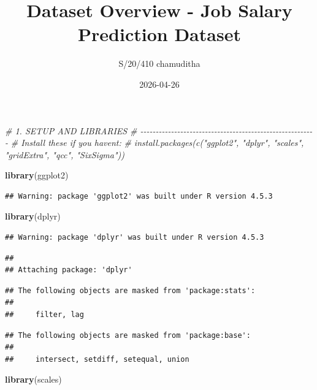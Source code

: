 \documentclass[
]{article}
\title{Dataset Overview - Job Salary Prediction Dataset}
\author{S/20/410 chamuditha}
\date{2026-04-26}
\newenvironment{Shaded}{\begin{snugshade}}{\end{snugshade}}
\newcommand{\CommentTok}[1]{\textcolor[rgb]{0.56,0.35,0.01}{\textit{#1}}}
\newcommand{\FunctionTok}[1]{\textcolor[rgb]{0.13,0.29,0.53}{\textbf{#1}}}
\newcommand{\NormalTok}[1]{#1}
\begin{document}
\maketitle

\begin{Shaded}
\begin{Highlighting}[]
\CommentTok{\# 1. SETUP AND LIBRARIES}
\CommentTok{\# {-}{-}{-}{-}{-}{-}{-}{-}{-}{-}{-}{-}{-}{-}{-}{-}{-}{-}{-}{-}{-}{-}{-}{-}{-}{-}{-}{-}{-}{-}{-}{-}{-}{-}{-}{-}{-}{-}{-}{-}{-}{-}{-}{-}{-}{-}{-}{-}{-}{-}{-}{-}{-}{-}{-}{-}{-}}
\CommentTok{\# Install these if you haven\textquotesingle{}t: }
\CommentTok{\# install.packages(c("ggplot2", "dplyr", "scales", "gridExtra", "qcc", "SixSigma"))}

\FunctionTok{library}\NormalTok{(ggplot2)}
\end{Highlighting}
\end{Shaded}

\begin{verbatim}
## Warning: package 'ggplot2' was built under R version 4.5.3
\end{verbatim}

\begin{Shaded}
\begin{Highlighting}[]
\FunctionTok{library}\NormalTok{(dplyr)}
\end{Highlighting}
\end{Shaded}

\begin{verbatim}
## Warning: package 'dplyr' was built under R version 4.5.3
\end{verbatim}

\begin{verbatim}
## 
## Attaching package: 'dplyr'
\end{verbatim}

\begin{verbatim}
## The following objects are masked from 'package:stats':
## 
##     filter, lag
\end{verbatim}

\begin{verbatim}
## The following objects are masked from 'package:base':
## 
##     intersect, setdiff, setequal, union
\end{verbatim}

\begin{Shaded}
\begin{Highlighting}[]
\FunctionTok{library}\NormalTok{(scales)}
\end{Highlighting}
\end{Shaded}
\end{document}
